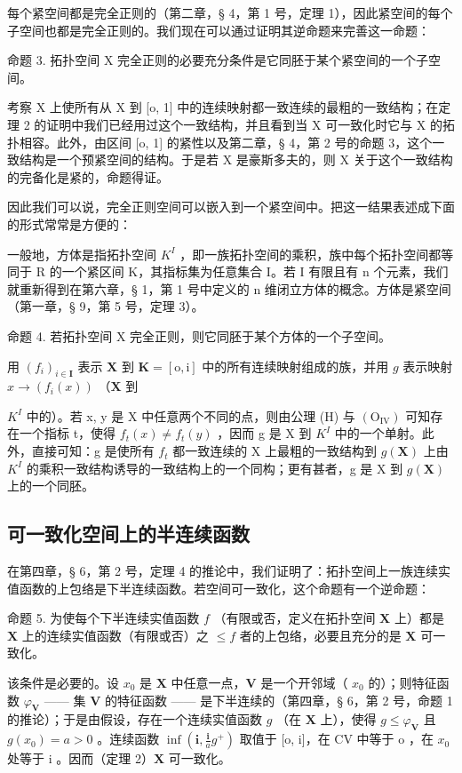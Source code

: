 每个紧空间都是完全正则的（第二章，§ 4，第 1 号，定理 1），因此紧空间的每个子空间也都是完全正则的。我们现在可以通过证明其逆命题来完善这一命题：

命题 3. 拓扑空间 X 完全正则的必要充分条件是它同胚于某个紧空间的一个子空间。

考察 X 上使所有从 X 到 {[}o, 1{]} 中的连续映射都一致连续的最粗的一致结构；在定理 2 的证明中我们已经用过这个一致结构，并且看到当 X 可一致化时它与 X 的拓扑相容。此外，由区间 {[}o, 1{]} 的紧性以及第二章，§ 4，第 2 号的命题 3，这个一致结构是一个预紧空间的结构。于是若 X 是豪斯多夫的，则 X 关于这个一致结构的完备化是紧的，命题得证。

因此我们可以说，完全正则空间可以嵌入到一个紧空间中。把这一结果表述成下面的形式常常是方便的：

一般地，方体是指拓扑空间 \(K^{I}\) ，即一族拓扑空间的乘积，族中每个拓扑空间都等同于 R 的一个紧区间 K，其指标集为任意集合 I。若 I 有限且有 n 个元素，我们就重新得到在第六章，§ 1，第 1 号中定义的 n 维闭立方体的概念。方体是紧空间（第一章，§ 9，第 5 号，定理 3）。

命题 4. 若拓扑空间 X 完全正则，则它同胚于某个方体的一个子空间。

用 \((f_{i})_{i\in \mathbf{I}}\) 表示 \(\mathbf{X}\) 到 \(\mathbf{K} = [\mathrm{o},\mathrm{i}]\) 中的所有连续映射组成的族，并用 \(g\) 表示映射 \(x\to (f_i(x))\) （\(\mathbf{X}\) 到

\(K^{I}\) 中的）。若 x, y 是 X 中任意两个不同的点，则由公理 (H) 与 \((\mathrm{O}_{\mathrm{IV}})\) 可知存在一个指标 t，使得 \(f_{t}(x) \neq f_{t}(y)\) ，因而 g 是 X 到 \(K^{I}\) 中的一个单射。此外，直接可知：g 是使所有 \(f_{t}\) 都一致连续的 X 上最粗的一致结构到 \(g(\mathbf{X})\) 上由 \(K^{I}\) 的乘积一致结构诱导的一致结构上的一个同构；更有甚者，g 是 X 到 \(g(\mathbf{X})\) 上的一个同胚。

\subsection{可一致化空间上的半连续函数}

在第四章，§ 6，第 2 号，定理 4 的推论中，我们证明了：拓扑空间上一族连续实值函数的上包络是下半连续函数。若空间可一致化，这个命题有一个逆命题：

命题 5. 为使每个下半连续实值函数 \(f\) （有限或否，定义在拓扑空间 \(\mathbf{X}\) 上）都是 \(\mathbf{X}\) 上的连续实值函数（有限或否）之 \(\leqslant f\) 者的上包络，必要且充分的是 \(\mathbf{X}\) 可一致化。

该条件是必要的。设 \(x_0\) 是 \(\mathbf{X}\) 中任意一点，\(\mathbf{V}\) 是一个开邻域（ \(x_0\) 的）；则特征函数 \(\varphi_{\mathbf{V}}\) —— 集 \(\mathbf{V}\) 的特征函数 —— 是下半连续的（第四章，§ 6，第 2 号，命题 1 的推论）；于是由假设，存在一个连续实值函数 \(g\) （在 \(\mathbf{X}\) 上），使得 \(g \leqslant \varphi_{\mathbf{V}}\) 且 \(g(x_0) = a > 0\) 。连续函数 \(\inf\left(\mathbf{i}, \frac{\mathbf{i}}{a} g^+\right)\) 取值于 {[}o, i{]}，在 CV 中等于 o ，在 \(x_0\) 处等于 i 。因而（定理 2）\(\mathbf{X}\) 可一致化。

